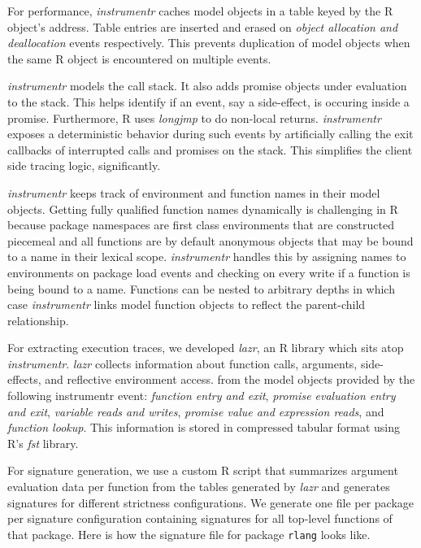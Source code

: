 \documentclass[review,nonacm,screen,acmsmall,anonymous=true]{acmart}
\newcommand{\code}[1]{\lstinline[style=R]|#1|\xspace}
\begin{document}
For performance, \emph{instrumentr} caches model objects in a table keyed by the
R object's address. Table entries are inserted and erased on \emph{object
  allocation and deallocation} events respectively. This prevents duplication of
model objects when the same R object is encountered on multiple events.

\emph{instrumentr} models the call stack. It also adds promise objects under
evaluation to the stack. This helps identify if an event, say a side-effect, is
occuring inside a promise. Furthermore, R uses \emph{longjmp} to do non-local
returns. \emph{instrumentr} exposes a deterministic behavior during such events
by artificially calling the exit callbacks of interrupted calls and promises on
the stack. This simplifies the client side tracing logic, significantly.

\emph{instrumentr} keeps track of environment and function names in their model
objects. Getting fully qualified function names dynamically is challenging in R
because package namespaces are first class environments that are constructed
piecemeal and all functions are by default anonymous objects that may be bound
to a name in their lexical scope. \emph{instrumentr} handles this by assigning
names to environments on package load events and checking on every write if a
function is being bound to a name. Functions can be nested to arbitrary depths
in which case \emph{instrumentr} links model function objects to reflect the
parent-child relationship.

For extracting execution traces, we developed \emph{lazr}, an R library which
sits atop \emph{instrumentr}. \emph{lazr} collects information about function
calls, arguments, side-effects, and reflective environment access. from the
model objects provided by the following instrumentr event: \emph{function entry
  and exit}, \emph{promise evaluation entry and exit}, \emph{variable reads and
  writes}, \emph{promise value and expression reads}, and \emph{function
  lookup}. This information is stored in compressed tabular format using R's
\emph{fst} library.

For signature generation, we use a custom R script that summarizes argument
evaluation data per function from the tables generated by \emph{lazr} and
generates signatures for different strictness configurations. We generate one
file per package per signature configuration containing signatures for all
top-level functions of that package. Here is how the signature file for package
\code{rlang} looks like.
\end{document}
